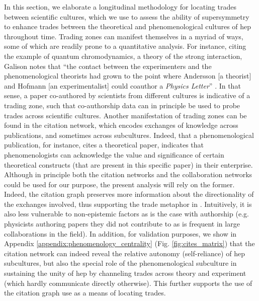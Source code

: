 \documentclass[smallextended]{svjour3}
\begin{document}
In this section, we elaborate a longitudinal methodology for locating trades between scientific cultures, which we use to assess the ability of supersymmetry to enhance trades between the theoretical and phenomenological cultures of \gls{hep} throughout time. Trading zones can manifest themselves in a myriad of ways, some of which are readily prone to a quantitative analysis. %
For instance, citing the example of quantum chromodynamics, a theory of the strong interaction, Galison notes that ``the contact between the experimenters and the phenomenological theorists had grown to the point where Andersson [a theorist] and Hofmann [an experimentalist] could coauthor a \textit{Physics Letter}'' \citep[p.~655]{galison1997image}. In that sense, a paper co-authored by scientists from different cultures is indicative of a trading zone, such that co-authorship data can in principle be used to probe trades across scientific cultures. Another manifestation of trading zones can be found in the citation network, which encodes exchanges of knowledge across publications, and sometimes across subcultures. Indeed, that a phenomenological publication, for instance, cites a theoretical paper, indicates that phenomenologists can acknowledge the value and significance of certain theoretical constructs (that are present in this specific paper) in their enterprise.  Although in principle both the citation networks and the collaboration networks could be used for our purpose, the present analysis will rely on the former. Indeed, the citation graph preserves more information about the directionality of the exchanges involved, thus supporting the trade metaphor in \citealt{Yan2013}. Intuitively, it is also less vulnerable to non-epistemic factors as is the case with authorship (e.g. physicists authoring papers they did not contribute to as is frequent in large collaborations in the field). In addition, for validation purposes, we show  in Appendix \ref{appendix:phenomenology_centrality} (Fig. \ref{fig:cites_matrix}) that the citation network can indeed reveal the relative autonomy (self-reliance) of \gls{hep} subcultures, but also the special role of the phenomenological subculture in sustaining the unity of \gls{hep} by channeling trades across theory and experiment (which hardly communicate directly otherwise). This further supports the use of the citation graph use as a means of locating trades.
\end{document}
